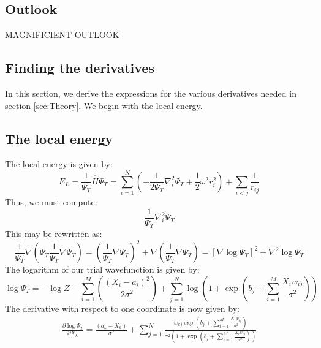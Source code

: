 \documentclass[a4paper, 10pt]{article}
\begin{document}
	\subsection{Outlook}
	MAGNIFICIENT OUTLOOK
	
	
	\pagebreak
	\begin{appendices}
	\section{Finding the derivatives}\label{ap:finding_derivatives}
	In this section, we derive the expressions for the various derivatives needed in section \ref{sec:Theory}. We begin with the local energy.
	\subsection{The local energy}\label{ap:local_energy}
	The local energy is given by:
	\begin{equation}\label{eq:ap_local_energy}
	E_L=\frac{1}{\Psi_T}\hat{H}\Psi_T= \sum_{i=1}^N \left(-\frac{1}{2\Psi_T}\nabla_i^2 \Psi_T + \frac{1}{2}\omega^2 r_i^2\right)+\sum_{i<j} \frac{1}{r_{ij}}
	\end{equation}
	Thus, we must compute:
	\begin{equation}
	\frac{1}{\Psi_T}\nabla_i^2 \Psi_T
	\end{equation}
	This may be rewritten as:
	\begin{equation}\label{eq:log_expression_for_trial_wavefunction}
	\frac{1}{\Psi_T}\nabla \left(\Psi_T \frac{1}{\Psi_T} \nabla\Psi_T\right)=\left(\frac{1}{\Psi_T}\nabla \Psi_T\right)^2+\nabla \left(\frac{1}{\Psi_T}\nabla \Psi_T \right)=\left[\nabla \log \Psi_T\right]^2 + \nabla^2 \log \Psi_T
	\end{equation}
	The logarithm of our trial wavefunction is given by:
	\begin{equation}\label{eq:logarithm_of_wavefunction}
	\log \Psi_T = -\log Z -\sum_{i=1}^M \left(\frac{(X_i-a_i)^2}{2\sigma^2}\right)+\sum_{j=1}^N \log \left(1+\exp \left(b_j+\sum_{i=1}^{M} \frac{X_iw_{ij}}{\sigma^2}\right)\right)
	\end{equation}
	The derivative with respect to one coordinate is now given by:
	\begin{equation}\label{eq:first_derivative_log_psi}
	\begin{split}
	\frac{\partial \log \Psi_T}{\partial X_k}=\frac{(a_k-X_k)}{\sigma^2}+\sum_{j=1}^N \frac{w_{kj} \exp \left(b_j+\sum_{i=1}^{M} \frac{X_iw_{ij}}{\sigma^2}\right)}{\sigma^2 \left(1+\exp \left(b_j+\sum_{i=1}^{M} \frac{X_iw_{ij}}{\sigma^2}\right)\right)}\\

\end{split}
\end{equation}
\end{appendices}
\end{document}
